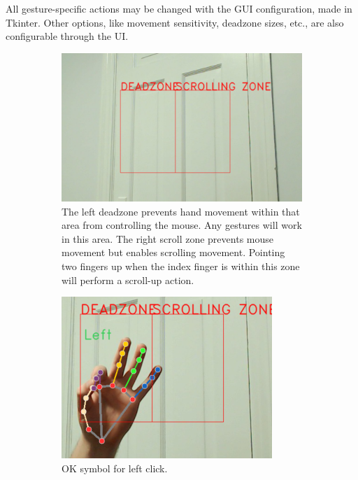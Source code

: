 \documentclass{article}
\begin{document}
All gesture-specific actions may be changed with the GUI configuration, made in Tkinter. Other options, like movement sensitivity, deadzone sizes, etc., are also configurable through the UI.

\begin{figure}
    \centering
    \begin{subfigure}[T]{0.76\textwidth}
        \centering
        \includegraphics[width=.8\linewidth]{deadzone.png}
        \caption{The left deadzone prevents hand movement within that area from controlling the mouse. Any gestures will work in this area. The right scroll zone prevents mouse movement but enables scrolling movement. Pointing two fingers up when the index finger is within this zone will perform a scroll-up action.}
    \end{subfigure}
    \begin{subfigure}[T]{0.3\textwidth}
        \centering
        \includegraphics[width=.8\linewidth]{ok.png}
        \caption{OK symbol for left click.}
    \end{subfigure}\hfill
    \begin{subfigure}[T]{0.3\textwidth}
        \centering

\end{subfigure}
\end{figure}
\end{document}
